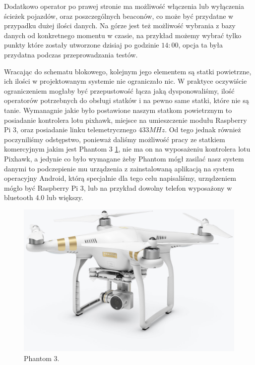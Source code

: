 Dodatkowo operator po prawej stronie ma możliwość włączenia lub wyłączenia ścieżek pojazdów, oraz poszczególnych beaconów, co może być przydatne w przypadku dużej ilości danych. Na górze jest też możliwość wybrania z bazy danych od konkretnego momentu w czasie, na przykład możemy wybrać tylko punkty które zostały utworzone dzisiaj po godzinie $14:00$, opcja ta była przydatna podczas przeprowadzania testów.

Wracając do schematu blokowego, kolejnym jego elementem są statki powietrzne, ich ilości w projektowanym systemie nie ograniczało nic. W praktyce oczywiście ograniczeniem mogłaby być przepustowość łącza jaką dysponowaliśmy, ilość operatorów potrzebnych do obsługi statków i na pewno same statki, które nie są tanie. Wymanagnie jakie było postawione naszym statkom powietrznym to posiadanie kontrolera lotu pixhawk, miejsce na umieszczenie modułu Raspberry Pi 3, oraz posiadanie linku telemetrycznego $433 MHz$. Od tego jednak również poczyniliśmy odstępstwo, ponieważ daliśmy możliwość pracy ze statkiem komercyjnym jakim jest Phantom 3 \ref{fig:phantom}, nie ma on na wyposażeniu kontrolera lotu Pixhawk, a jedynie co było wymagane żeby Phantom mógł zasilać nasz system danymi to podczepienie mu urządzenia z zainstalowaną aplikacją na system operacyjny Android, którą specjalnie dla tego celu napisaliśmy, urządzeniem mógło być Raspberry Pi 3, lub na przykład dowolny telefon wyposażony w bluetooth 4.0 lub większy.

\begin{figure}[!th]
    \centering
    \includegraphics[width=15cm]{zalaczniki/obrazy/phantom3.jpg}
    \caption{Phantom 3.}
    \label{fig:phantom}
\end{figure}

